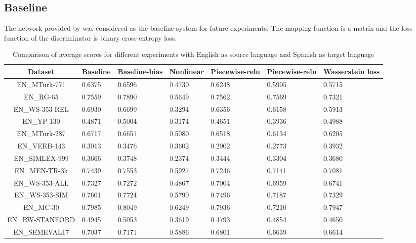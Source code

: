 \documentclass[11pt]{article}
\begin{document}
\subsection{Baseline} \label{baseline}
The network provided by \cite{muserepo} was considered as the baseline system for future experiments. The mapping function is a matrix and the loss function of the discriminator is binary cross-entropy loss.

\begin{table*}[ht]
  \begin{center}
  \begin{tabular}{|c|l|l|l|l|l|l|}
  \hline
  Dataset & Baseline & Baseline-bias & Nonlinear & Piecewise-relu & Piecewise-relu & Wasserstein loss\\
  \hline
  EN\_MTurk-771 & 0.6375 & 0.6596 & 0.4730 & 0.6248 & 0.5905 & 0.5715 \\
  \hline
  EN\_RG-65 & 0.7559 & 0.7890 & 0.5649 & 0.7562 & 0.7569 & 0.7321 \\
  \hline
  EN\_WS-353-REL & 0.6930 & 0.6699 & 0.3294 & 0.6356 & 0.6158 & 0.5913 \\
  \hline
  EN\_YP-130 & 0.4871 & 0.5004 & 0.3174 & 0.4651 & 0.3936 & 0.4988 \\
  \hline
  EN\_MTurk-287 & 0.6717 & 0.6651 & 0.5080 & 0.6518 & 0.6134 & 0.6205 \\
  \hline
  EN\_VERB-143 & 0.3013 & 0.3476 & 0.3602 & 0.2902 & 0.2773 & 0.3932 \\
  \hline
  EN\_SIMLEX-999 & 0.3666 & 0.3748 & 0.2374 & 0.3444 & 0.3304 & 0.3680 \\
  \hline
  EN\_MEN-TR-3k & 0.7439 & 0.7553 & 0.5927 & 0.7246 & 0.7141 & 0.7081 \\
  \hline
  EN\_WS-353-ALL & 0.7327 & 0.7272 & 0.4867 & 0.7004 & 0.6959 & 0.6741 \\
  \hline
  EN\_WS-353-SIM & 0.7601 & 0.7724 & 0.5790 & 0.7496 & 0.7187 & 0.7329 \\
  \hline
  EN\_MC-30 & 0.7985 & 0.8049 & 0.6249 & 0.7936 & 0.7210 & 0.7947 \\
  \hline
  EN\_RW-STANFORD & 0.4945 & 0.5053 & 0.3619 & 0.4793 & 0.4854 & 0.4650 \\
  \hline
  EN\_SEMEVAL17 & 0.7037 & 0.7171 & 0.5886 & 0.6801 & 0.6639 & 0.6614 \\
  \hline
  \end{tabular}
  \end{center}
  \caption{ Comparison of average scores for different experiments with English as source language and Spanish as target language}
  \label{summa}
\end{table*}
\end{document}
